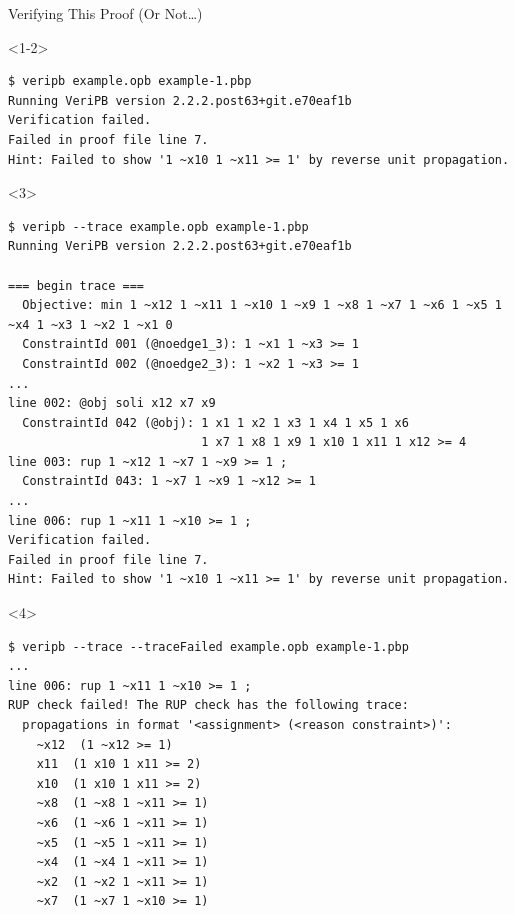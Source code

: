 \documentclass[aspectratio=169,compress,10pt]{beamer}
\begin{document}
\begin{frame}[fragile,t]{Verifying This Proof (Or Not\ldots)}
\begin{onlyenv}<1-2>\footnotesize
\begin{Verbatim}
$ veripb example.opb example-1.pbp
Running VeriPB version 2.2.2.post63+git.e70eaf1b
Verification failed.
Failed in proof file line 7.
Hint: Failed to show '1 ~x10 1 ~x11 >= 1' by reverse unit propagation.
\end{Verbatim}
\end{onlyenv}\begin{onlyenv}<3>%
\begin{Verbatim}[commandchars=\\\{\},fontsize=\footnotesize]
$ veripb --trace example.opb example-1.pbp
Running VeriPB version 2.2.2.post63+git.e70eaf1b

=== begin trace ===
  Objective: min 1 ~x12 1 ~x11 1 ~x10 1 ~x9 1 ~x8 1 ~x7 1 ~x6 1 ~x5 1 ~x4 1 ~x3 1 ~x2 1 ~x1 0
  ConstraintId 001 (@noedge1_3): 1 ~x1 1 ~x3 >= 1
  ConstraintId 002 (@noedge2_3): 1 ~x2 1 ~x3 >= 1
...
line 002: @obj soli x12 x7 x9
  ConstraintId 042 (@obj): 1 x1 1 x2 1 x3 1 x4 1 x5 1 x6
                           1 x7 1 x8 1 x9 1 x10 1 x11 1 x12 >= 4
line 003: rup 1 ~x12 1 ~x7 1 ~x9 >= 1 ;
  ConstraintId 043: 1 ~x7 1 ~x9 1 ~x12 >= 1
...
line 006: rup 1 ~x11 1 ~x10 >= 1 ;
Verification failed.
Failed in proof file line 7.
Hint: Failed to show '1 ~x10 1 ~x11 >= 1' by reverse unit propagation.
\end{Verbatim}
\end{onlyenv}\begin{onlyenv}<4>%
\begin{Verbatim}[commandchars=\\\{\},fontsize=\footnotesize]
$ veripb --trace --traceFailed example.opb example-1.pbp
...
line 006: rup 1 ~x11 1 ~x10 >= 1 ;
RUP check failed! The RUP check has the following trace:
  propagations in format '<assignment> (<reason constraint>)':
    ~x12  (1 ~x12 >= 1)
    x11  (1 x10 1 x11 >= 2)
    x10  (1 x10 1 x11 >= 2)
    ~x8  (1 ~x8 1 ~x11 >= 1)
    ~x6  (1 ~x6 1 ~x11 >= 1)
    ~x5  (1 ~x5 1 ~x11 >= 1)
    ~x4  (1 ~x4 1 ~x11 >= 1)
    ~x2  (1 ~x2 1 ~x11 >= 1)
    ~x7  (1 ~x7 1 ~x10 >= 1)


\end{Verbatim}
\end{onlyenv}
\end{frame}
\end{document}
